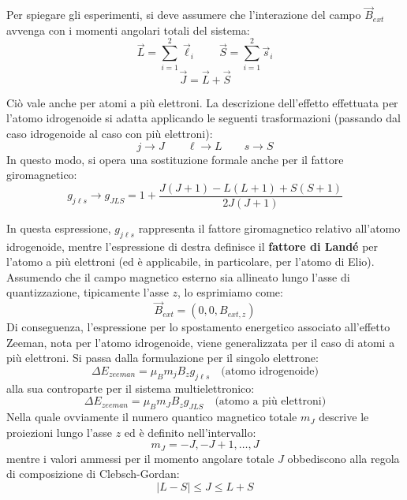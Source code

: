 Per spiegare gli esperimenti, si deve assumere che l'interazione del campo \(\vec{B}_{ext}\) avvenga con i momenti angolari totali del sistema:
\begin{equation}
    \vec{L} = \sum_{i=1}^{2} \vec{\ell}_i \qquad \vec{S} = \sum_{i=1}^{2} \vec{s}_i
\end{equation}
\begin{equation}
    \vec{J} = \vec{L} + \vec{S}
\end{equation}

Ciò vale anche per atomi a più elettroni. La descrizione dell'effetto effettuata per l'atomo idrogenoide si adatta applicando le seguenti trasformazioni (passando dal caso idrogenoide al caso con più elettroni):
\begin{equation}
    j \longrightarrow J \qquad \ell \longrightarrow L \qquad s \longrightarrow S
\end{equation}
In questo modo, si opera una sostituzione formale anche per il fattore giromagnetico:
\begin{equation}
    g_{j\ell s} \longrightarrow g_{JLS} = 1 + \frac{J(J+1) - L(L+1) + S(S+1)}{2J(J+1)}
\end{equation}

In questa espressione, \( g_{j\ell s} \) rappresenta il fattore giromagnetico relativo all'atomo idrogenoide, mentre l'espressione di destra definisce il \textbf{fattore di Landé} per l'atomo a più elettroni (ed è applicabile, in particolare, per l'atomo di Elio).\\
Assumendo che il campo magnetico esterno sia allineato lungo l'asse di quantizzazione, tipicamente l'asse \( z \), lo esprimiamo come:
\begin{equation}
    \vec{B}_{ext} = (0, 0, B_{ext,z})
\end{equation}
Di conseguenza, l'espressione per lo spostamento energetico associato all'effetto Zeeman, nota per l'atomo idrogenoide, viene generalizzata per il caso di atomi a più elettroni. Si passa dalla formulazione per il singolo elettrone:
\begin{equation}
    \Delta E_{zeeman} = \mu_B m_j B_z g_{j\ell s} \quad \text{(atomo idrogenoide)}
\end{equation}
alla sua controparte per il sistema multielettronico:
\begin{equation}
    \Delta E_{zeeman} = \mu_B m_J B_z g_{JLS} \quad \text{(atomo a più elettroni)}
\end{equation}
Nella quale ovviamente il numero quantico magnetico totale \( m_J \) descrive le proiezioni lungo l'asse \( z \) ed è definito nell'intervallo:
\begin{equation}
    m_J = -J, -J+1, \dots, J
\end{equation}
mentre i valori ammessi per il momento angolare totale \( J \) obbediscono alla regola di composizione di Clebsch-Gordan:
\begin{equation}
    |L - S| \le J \le L + S
\end{equation}

